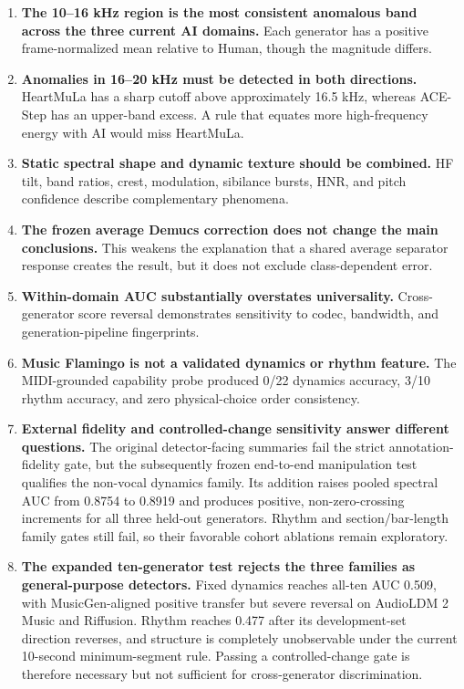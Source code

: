 \documentclass[11pt,a4paper]{article}
\begin{document}
\begin{enumerate}
  \item \textbf{The 10--16 kHz region is the most consistent anomalous band across the three current AI domains.} Each generator has a positive frame-normalized mean relative to Human, though the magnitude differs.
  \item \textbf{Anomalies in 16--20 kHz must be detected in both directions.} HeartMuLa has a sharp cutoff above approximately 16.5 kHz, whereas ACE-Step has an upper-band excess. A rule that equates more high-frequency energy with AI would miss HeartMuLa.
  \item \textbf{Static spectral shape and dynamic texture should be combined.} HF tilt, band ratios, crest, modulation, sibilance bursts, HNR, and pitch confidence describe complementary phenomena.
  \item \textbf{The frozen average Demucs correction does not change the main conclusions.} This weakens the explanation that a shared average separator response creates the result, but it does not exclude class-dependent error.
  \item \textbf{Within-domain AUC substantially overstates universality.} Cross-generator score reversal demonstrates sensitivity to codec, bandwidth, and generation-pipeline fingerprints.
  \item \textbf{Music Flamingo is not a validated dynamics or rhythm feature.} The MIDI-grounded capability probe produced 0/22 dynamics accuracy, 3/10 rhythm accuracy, and zero physical-choice order consistency.
  \item \textbf{External fidelity and controlled-change sensitivity answer different questions.} The original detector-facing summaries fail the strict annotation-fidelity gate, but the subsequently frozen end-to-end manipulation test qualifies the non-vocal dynamics family. Its addition raises pooled spectral AUC from 0.8754 to 0.8919 and produces positive, non-zero-crossing increments for all three held-out generators. Rhythm and section/bar-length family gates still fail, so their favorable cohort ablations remain exploratory.
  \item \textbf{The expanded ten-generator test rejects the three families as general-purpose detectors.} Fixed dynamics reaches all-ten AUC 0.509, with MusicGen-aligned positive transfer but severe reversal on AudioLDM 2 Music and Riffusion. Rhythm reaches 0.477 after its development-set direction reverses, and structure is completely unobservable under the current 10-second minimum-segment rule. Passing a controlled-change gate is therefore necessary but not sufficient for cross-generator discrimination.

\end{enumerate}
\end{document}
